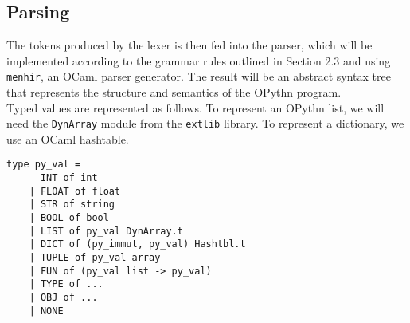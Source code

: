 \documentclass[11pt, twoside]{article}
\newcommand{\ms}{\texttt}
\begin{document}
    \subsection{Parsing}
    The tokens produced by the lexer is then fed into the parser, which will be implemented according to the grammar rules outlined in Section 2.3 and using \texttt{menhir}, an OCaml parser generator. The result will be an abstract syntax tree that represents the structure and semantics of the OPythn program.\\
     \indent Typed values are represented as follows. To represent an OPythn list, we will need the \ms{DynArray} module from the \ms{extlib} library. To represent a dictionary, we use an OCaml hashtable.
    \begin{lstlisting}[language=caml]
    type py_val =
      INT of int
    | FLOAT of float
    | STR of string
    | BOOL of bool
    | LIST of py_val DynArray.t
    | DICT of (py_immut, py_val) Hashtbl.t
    | TUPLE of py_val array
    | FUN of (py_val list -> py_val)
    | TYPE of ...
    | OBJ of ...
    | NONE
    \end{lstlisting}
\end{document}
